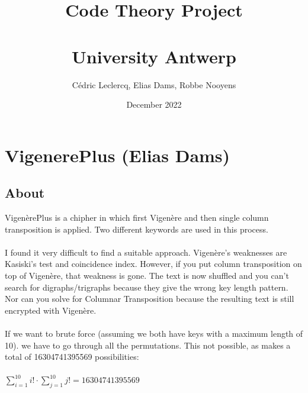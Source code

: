 \documentclass{article}
\title{Code Theory Project\\\\ University Antwerp}
\author{Cédric Leclercq, Elias Dams, Robbe Nooyens}
\date{December 2022}
\begin{document}
\maketitle

\tableofcontents

\newpage

\section{VigenerePlus (Elias Dams)}
\subsection{About}
VigenèrePlus is a chipher in which first Vigenère and then single column transposition is applied. Two different keywords are used in this process.\\
\\
I found it very difficult to find a suitable approach. Vigenère's weaknesses are Kasiski's test and coincidence index. However, if you put column transposition on top of Vigenère, that weakness is gone. The text is now shuffled and you can't search for digraphs/trigraphs because they give the wrong key length pattern. Nor can you solve for Columnar Transposition because the resulting text is still encrypted with Vigenère.\\
\\
If we want to brute force (assuming we both have keys with a maximum length of 10). we have to go through all the permutations. This not possible, as makes a total of 16304741395569 possibilities: \\
\\
$\sum_{i=1}^{10} i! \cdot \sum_{j=1}^{10} j! = 16304741395569$\\
\end{document}
